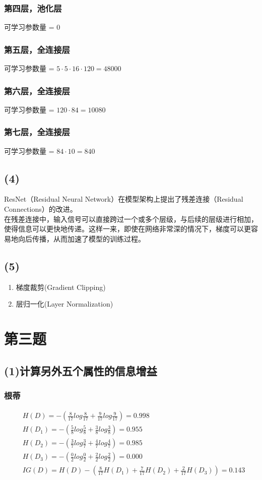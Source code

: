 \documentclass[12pt,a4paper]{article}
\begin{document}
\subsubsection*{第四层，池化层}
可学习参数量 = $0$
\subsubsection*{第五层，全连接层}
可学习参数量 = $5\cdot 5\cdot 16\cdot120 = 48000$
\subsubsection*{第六层，全连接层}
可学习参数量 = $120\cdot 84 = 10080$
\subsubsection*{第七层，全连接层}
可学习参数量 = $84\cdot 10 = 840$
\subsection*{(4)}
ResNet（Residual Neural Network）在模型架构上提出了残差连接（Residual Connections）的改进。\\
在残差连接中，输入信号可以直接跨过一个或多个层级，与后续的层级进行相加，使得信息可以更快地传递。这样一来，即使在网络非常深的情况下，梯度可以更容易地向后传播，从而加速了模型的训练过程。
\subsection*{(5)}
\begin{enumerate}
    \item 梯度裁剪(Gradient Clipping)
    \item 层归一化(Layer Normalization)
\end{enumerate}
\section{第三题}
\subsection*{(1)计算另外五个属性的信息增益}
\subsubsection*{根蒂}
\begin{center}
    \begin{align*}
         & H(D) = -(\frac{8}{17}log\frac{8}{17}+\frac{9}{17}log\frac{9}{17}) = 0.998         \\
         & H(D_1) = -(\frac{5}{8}log\frac{5}{8}+\frac{3}{8}log\frac{3}{8}) = 0.955           \\
         & H(D_2) = -(\frac{3}{7}log\frac{3}{7}+\frac{4}{7}log\frac{4}{7}) = 0.985           \\
         & H(D_3) = -(\frac{0}{2}log\frac{0}{2}+\frac{2}{2}log\frac{2}{2}) = 0.000           \\
         & IG(D) = H(D) - (\frac{8}{17}H(D_1)+\frac{7}{17}H(D_2)+\frac{2}{17}H(D_3)) = 0.143
    \end{align*}
\end{center}
\end{document}
